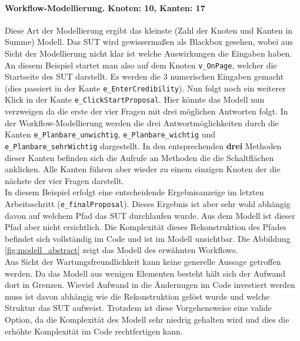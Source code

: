\paragraph{Workflow-Modellierung. Knoten: 10, Kanten: 17}
Diese Art der Modellierung ergibt das kleinste (Zahl der Knoten und Kanten in Summe) Modell. Das \Gls{SUT} wird gewissermaßen als Blackbox gesehen, wobei aus Sicht der Modellierung nicht klar ist welche Auswirkungen die Eingaben haben. An diesem Beispiel startet man also auf dem Knoten \texttt{v\_OnPage}, welcher die Startseite des \Gls{SUT} darstellt. Es werden die 3 numerischen Eingaben gemacht (dies passiert in der Kante \texttt{e\_EnterCredibility}). Nun folgt noch ein weiterer Klick in der Kante \texttt{e\_ClickStartProposal}. Hier könnte das Modell nun verzweigen da die erste der vier Fragen mit drei möglichen Antworten folgt. In der Workflow-Modellierung werden die drei Antwortmöglichkeiten durch die Kanten \texttt{e\_Planbare\_unwichtig}, \texttt{e\_Planbare\_wichtig} und \texttt{e\_Planbare\_sehrWichtig} dargestellt. In den entsprechenden \textbf{drei} Methoden dieser Kanten befinden sich die Aufrufe an Methoden die die Schaltflächen anklicken. Alle Kanten führen aber wieder zu einem einzigen Knoten der die nächste der vier Fragen darstellt.\\
In diesem Beispiel erfolgt eine entscheidende Ergebnisanzeige im letzten Arbeitsschritt (\texttt{e\_finalProposal}). Dieses Ergebnis ist aber sehr wohl abhängig davon auf welchem Pfad das \Gls{SUT} durchlaufen wurde. Aus dem Modell ist dieser Pfad aber nicht ersichtlich. Die Komplexität dieses Rekonstruktion des Pfades befindet sich vollständig im Code und ist im Modell unsichtbar. Die Abbildung \ref{fig:modell_abstract} zeigt das Modell des erwähnten Workflows.\\
Aus Sicht der Wartungsfreundlichkeit kann keine generelle Aussage getroffen werden. Da das Modell aus wenigen Elementen besteht hält sich der Aufwand dort in Grenzen. Wieviel Aufwand in die Ändernugen im Code investiert werden muss ist davon abhängig wie die Rekonstruktion gelöst wurde und welche Struktur das \Gls{SUT} aufweist. Trotzdem ist diese Vorgehensweise eine valide Option, da die Komplexität des Modell sehr niedrig gehalten wird und dies die erhöhte Komplexität im Code rechtfertigen kann.

